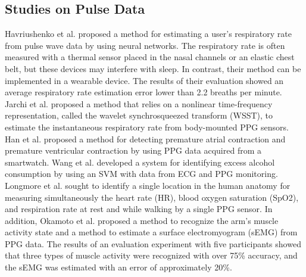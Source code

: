\documentclass{ieeeaccess}
\begin{document}
\subsection{Studies on Pulse Data}
Havriushenko et al. \cite{respiratory_rate_estimation1} proposed a method for estimating a user's respiratory rate from pulse wave data by using neural networks. The respiratory rate is often measured with a thermal sensor placed in the nasal channels or an elastic chest belt, but these devices may interfere with sleep. In contrast, their method can be implemented in a wearable device. The results of their evaluation showed an average respiratory rate estimation error lower than 2.2 breaths per minute. Jarchi et al. \cite{respiratory_rate_estimation2} proposed a method that relies on a nonlinear time-frequency representation, called the wavelet synchrosqueezed transform (WSST), to estimate the instantaneous respiratory rate from body-mounted PPG sensors. Han et al. \cite{arrhythmia_detection} proposed a method for detecting premature atrial contraction and premature ventricular contraction by using PPG data acquired from a smartwatch. Wang et al. \cite{alcohol_detection} developed a system for identifying excess alcohol consumption by using an SVM with data from ECG and PPG monitoring. Longmore et al. \cite{ppg_location} sought to identify a single location in the human anatomy for measuring simultaneously the heart rate (HR), blood oxygen saturation (SpO2), and respiration rate at rest and while walking by a single PPG sensor. In addition, Okamoto et al. \cite{semg_okamoto} proposed a method to recognize the arm's muscle activity state and a method to estimate a surface electromyogram (sEMG) from PPG data. The results of an evaluation experiment with five participants showed that three types of muscle activity were recognized with over 75\% accuracy, and the sEMG was estimated with an error of approximately 20\%.\par
\end{document}
